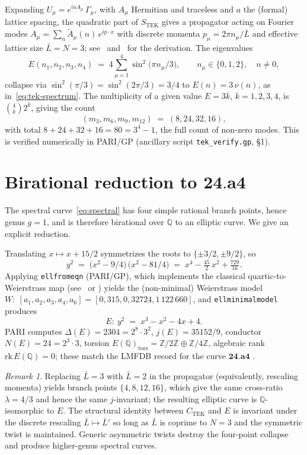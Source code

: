 \documentclass[11pt]{amsart}
\theoremstyle{definition}
\theoremstyle{remark}
\newtheorem{remark}[theorem]{Remark}
\newcommand{\Q}{\mathbb{Q}}
\newcommand{\Z}{\mathbb{Z}}
\newcommand{\TEK}{\mathrm{TEK}}
\begin{document}
Expanding \(U_{\mu} = e^{i a A_{\mu}}\,\Gamma_{\mu}\), with
\(A_{\mu}\) Hermitian and traceless and \(a\) the (formal) lattice
spacing, the quadratic part of \(S_{\TEK}\) gives a propagator
acting on Fourier modes
\(A_{\mu} = \sum_{n}\widetilde{A}_{\mu}(n)\, e^{i p\cdot x}\) with
discrete momenta
\(p_{\mu} = 2\pi n_{\mu}/\bar{L}\) and effective lattice size
\(\bar{L} = N = 3\); see~\cite[Sec.~2]{CosterLucini2002}
and~\cite[\S 3]{BringoltzSharpe2008} for the derivation. The
eigenvalues
\[
  E(n_{1}, n_{2}, n_{3}, n_{4})
  \;=\; 4 \sum_{\mu=1}^{4} \sin^{2}\!\bigl(\pi n_{\mu}/3\bigr),
  \qquad n_{\mu} \in \{0, 1, 2\}, \quad n \neq 0,
\]
collapse via \(\sin^{2}(\pi/3) = \sin^{2}(2\pi/3) = 3/4\) to
\(E(n) = 3\,\nu(n)\), as in~\eqref{eq:tek-spectrum}. The multiplicity
of a given value \(E = 3k\), \(k = 1, 2, 3, 4\), is
\(\binom{4}{k} 2^{k}\), giving the count
\[
  (m_{3}, m_{6}, m_{9}, m_{12}) \;=\; (8, 24, 32, 16),
\]
with total \(8 + 24 + 32 + 16 = 80 = 3^{4} - 1\), the full count of
non-zero modes. This is verified numerically in PARI/GP
(ancillary script \texttt{tek\_verify.gp}, \S 1).

\section{Birational reduction to \(\mathbf{24.a4}\)}\label{sec:reduction}

The spectral curve~\eqref{eq:spectral} has four simple rational
branch points, hence genus \(g = 1\), and is therefore birational
over \(\Q\) to an elliptic curve. We give an explicit reduction.

Translating \(x \mapsto x + 15/2\) symmetrizes the roots to
\(\{\pm 3/2, \pm 9/2\}\), so
\[
  y^{2} \;=\; \bigl(x^{2} - 9/4\bigr)\,\bigl(x^{2} - 81/4\bigr)
  \;=\; x^{4} - \tfrac{45}{2}\,x^{2} + \tfrac{729}{16}.
\]
Applying \texttt{ellfromeqn} (PARI/GP), which implements the
classical quartic-to-Weierstrass map (see~\cite[\S 7.2]{Cassels1991}
or \cite[\S 8]{Connell1999}) yields the (non-minimal) Weierstrass
model
\(W\colon\ [a_{1}, a_{2}, a_{3}, a_{4}, a_{6}]
= [0, 315, 0, 32724, 1\,122\,660]\),
and \texttt{ellminimalmodel} produces
\[
  E\colon\ y^{2} \;=\; x^{3} - x^{2} - 4x + 4.
\]
PARI computes
\(\Delta(E) = 2304 = 2^{8}\cdot 3^{2}\),
\(j(E) = 35152/9\),
conductor \(N(E) = 24 = 2^{3}\cdot 3\),
torsion \(E(\Q)_{\mathrm{tors}} = \Z/2\Z \oplus \Z/4\Z\),
algebraic rank \(\mathrm{rk}\,E(\Q) = 0\); these match the LMFDB
record for the curve \(\mathbf{24.a4}\) \cite{LMFDB}.

\begin{remark}\label{rem:scale}
Replacing \(\bar L = 3\) with \(\bar L = 2\) in the propagator
(equivalently, rescaling momenta) yields branch points
\(\{4, 8, 12, 16\}\), which give the same cross-ratio
\(\lambda = 4/3\) and hence the same \(j\)-invariant; the resulting
elliptic curve is \(\Q\)-isomorphic to \(E\). The structural identity
between \(C_{\TEK}\) and \(E\) is invariant under the discrete
rescaling \(\bar L \mapsto \bar L'\) so long as \(\bar L\) is coprime
to \(N = 3\) and the symmetric twist is maintained. Generic
asymmetric twists destroy the four-point collapse and produce
higher-genus spectral curves.
\end{remark}
\end{document}
